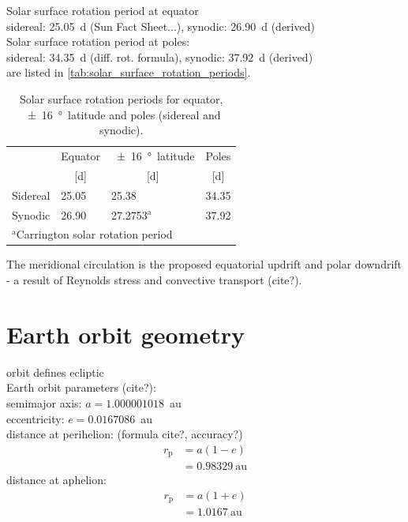 Solar surface rotation period at equator\\
sidereal: 25.05~d (Sun Fact Sheet...), synodic: 26.90~d (derived)\\
Solar surface rotation period at poles:\\
sidereal: 34.35~d (diff. rot. formula), synodic: 37.92~d (derived)\\
are listed in \autoref{tab:solar_surface_rotation_periods}.\\
\begin{table}[htb]\small
	\centering
	\captionsetup{belowskip=4pt}
	\caption{Solar surface rotation periods for equator, \SI{+-16}{\degree}~latitude and poles (sidereal and synodic).}
	\begin{tabular}{llll}
		\toprule
				&Equator	&\SI{+-16}{\degree}~latitude	&Poles\\
				&\multicolumn{1}{c}{[d]}	&\multicolumn{1}{c}{[d]}	&\multicolumn{1}{c}{[d]}\\
		\midrule
		Sidereal	&25.05	&25.38	&34.35\\
		Synodic	&26.90	&27.2753$^\text{a}$	&37.92\\
		\bottomrule
		\multicolumn{4}{l}{\footnotesize{$^\text{a}$Carrington solar rotation period}}
	\end{tabular}
	\label{tab:solar_surface_rotation_periods}
\end{table}



The meridional circulation is the proposed equatorial updrift and polar downdrift - a result of Reynolds stress and convective transport (cite?).\\


\section{Earth orbit geometry}
\label{sec:earth_orbit_geometry}

orbit defines ecliptic\\

Earth orbit parameters (cite?):\\
semimajor axis: $a = 1.000001018$~au\\
eccentricity: $e = 0.0167086$~au\\
distance at perihelion: (formula cite?, accuracy?)\\
\begin{align}
	r_\text{p} &= a (1 - e)\\
		&= 0.98329~\text{au}	\nonumber
\end{align}
distance at aphelion:\\
\begin{align}
	r_\text{p} &= a (1 + e)\\
		&= 1.0167~\text{au}	\nonumber
\end{align}

